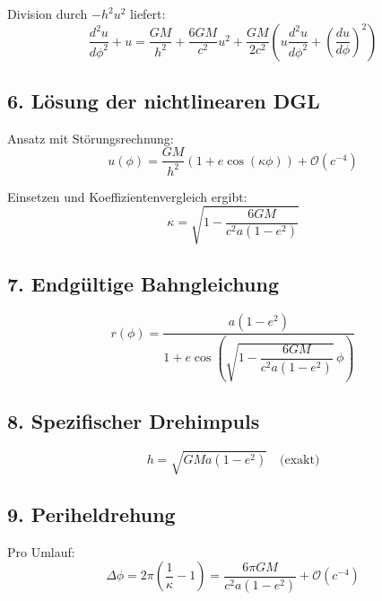 Division durch $-h^2u^2$ liefert:
\begin{equation}
\frac{d^2u}{d\phi^2} + u = \frac{GM}{h^2} + \frac{6GM}{c^2}u^2 + \frac{GM}{2c^2}\left(u\frac{d^2u}{d\phi^2} + \left(\frac{du}{d\phi}\right)^2\right)
\end{equation}

\subsection*{6. Lösung der nichtlinearen DGL}
Ansatz mit Störungsrechnung:
\begin{equation}
u(\phi) = \frac{GM}{h^2}\left(1 + e\cos(\kappa\phi)\right) + \mathcal{O}(c^{-4})
\end{equation}

Einsetzen und Koeffizientenvergleich ergibt:
\begin{equation}
\kappa = \sqrt{1 - \frac{6GM}{c^2a(1-e^2)}}
\end{equation}

\subsection*{7. Endgültige Bahngleichung}
\begin{equation}
r(\phi) = \frac{a(1-e^2)}{1 + e\cos\left(\sqrt{1 - \dfrac{6GM}{c^2a(1-e^2)}}\,\phi\right)}
\end{equation}

\subsection*{8. Spezifischer Drehimpuls}
\begin{equation}
h = \sqrt{GMa(1-e^2)} \quad \text{(exakt)}
\end{equation}

\subsection*{9. Periheldrehung}
Pro Umlauf:
\begin{equation}
\Delta\phi = 2\pi\left(\frac{1}{\kappa} - 1\right) = \frac{6\pi GM}{c^2a(1-e^2)} + \mathcal{O}(c^{-4})
\end{equation}
